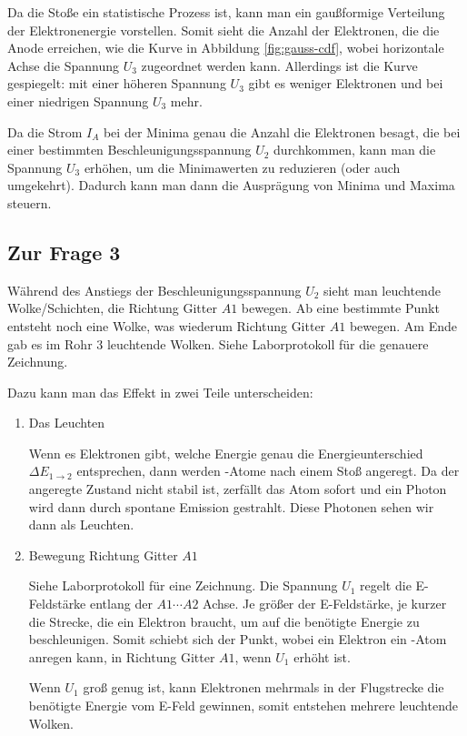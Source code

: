 		Da die Stoße ein statistische Prozess ist, kann man ein gaußformige Verteilung der Elektronenergie vorstellen. Somit sieht die Anzahl der Elektronen, die die Anode erreichen, wie die Kurve in Abbildung \ref{fig:gauss-cdf}, wobei horizontale Achse die Spannung $U_3$ zugeordnet werden kann. Allerdings ist die Kurve gespiegelt: mit einer höheren Spannung $U_3$ gibt es weniger Elektronen und bei einer niedrigen Spannung $U_3$ mehr. 

		Da die Strom $I_A$ bei der Minima genau die Anzahl die Elektronen besagt, die bei einer bestimmten Beschleunigungsspannung $U_2$ durchkommen, kann man die Spannung $U_3$ erhöhen, um die Minimawerten zu reduzieren (oder auch umgekehrt). Dadurch kann man dann die Ausprägung von Minima und Maxima steuern. 

	\subsection{Zur Frage 3}
		Während des Anstiegs der Beschleunigungsspannung $U_2$ sieht man leuchtende Wolke/Schichten, die Richtung Gitter $A1$ bewegen. Ab eine bestimmte Punkt entsteht noch eine Wolke, was wiederum Richtung Gitter $A1$ bewegen. Am Ende gab es im Rohr 3 leuchtende Wolken. Siehe Laborprotokoll für die genauere Zeichnung. 

		Dazu kann man das Effekt in zwei Teile unterscheiden:
		\begin{enumerate}
			\item Das Leuchten \par
				Wenn es Elektronen gibt, welche Energie genau die Energieunterschied $\Delta E_{1 \rightarrow 2}$ entsprechen, dann werden -Atome nach einem Stoß angeregt. Da der angeregte Zustand nicht stabil ist, zerfällt das 
				Atom sofort und ein Photon wird dann durch spontane Emission gestrahlt. Diese Photonen sehen wir dann als Leuchten.
			\item Bewegung Richtung Gitter $A1$ \par
				Siehe Laborprotokoll für eine Zeichnung. Die Spannung $U_1$ regelt die E-Feldstärke entlang der $A1\cdots A2$ Achse. Je größer der E-Feldstärke, je kurzer die Strecke, die ein Elektron braucht, um auf die benötigte Energie zu beschleunigen. Somit schiebt sich der Punkt, wobei ein Elektron ein -Atom anregen kann, in Richtung Gitter $A1$, wenn $U_1$ erhöht ist. \par
				Wenn $U_1$ groß genug ist, kann Elektronen mehrmals in der Flugstrecke die benötigte Energie vom E-Feld gewinnen, somit entstehen mehrere leuchtende Wolken.
		\end{enumerate}

